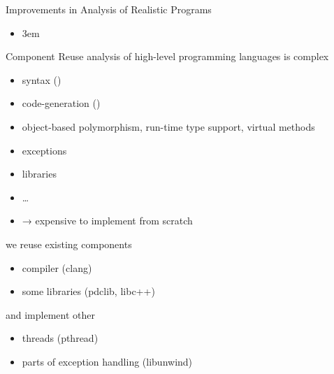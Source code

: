 \documentclass[aspectratio=169, fi]{paradise-slide}
\newcommand{\fcite}[1]{\emergencystretch 3em{\protect\NoHyper\cite{#1}}~\fullcite{#1}}
\newenvironment{prespart}[1]{%
  \begin{frame}{}%
    \centering
      {\Large #1} \par\bigskip\bigskip%
}{%
  \end{frame}%
}
\begin{document}
\begin{prespart}{Improvements in Analysis of Realistic Programs}
  \begin{itemize}
    \item \fcite{SRB2017}
  \end{itemize}
\end{prespart}

\begin{frame}{Component Reuse}
  analysis of high-level programming languages is complex \pause
  \begin{itemize}
    \item syntax () \pause
    \item code-generation () \pause
    \item object-based polymorphism, run-time type support, virtual methods \pause
    \item exceptions \pause
    \item libraries
    \item … \pause
    \item → expensive to implement from scratch
  \end{itemize}

  \pause\bigskip
  we reuse existing components
  \begin{itemize}
    \item compiler (clang)
    \item some libraries (pdclib, libc++)
  \end{itemize}

  and implement other
  \begin{itemize}
    \item threads (pthread)
    \item parts of exception handling (libunwind)
  \end{itemize}
\end{frame}
\end{document}
